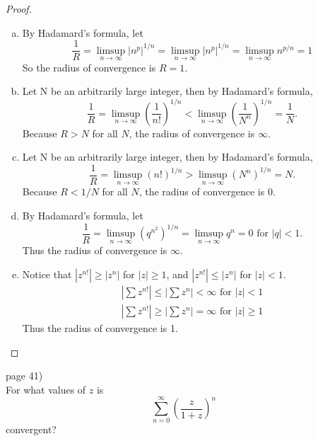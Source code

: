 \documentclass{article}
\newenvironment{problem}[2][Problem]{\begin{trivlist}
\item[\hskip \labelsep {\bfseries #1}\hskip \labelsep {\bfseries #2.}]}{\end{trivlist}}
\begin{document}
\begin{proof}
  \begin{enumerate}[(a)]
    \item By Hadamard's formula, let
      \[
        \frac{1}{R} = \limsup_{n \rightarrow \infty} |n^p|^{1/n}
        = \limsup_{n \rightarrow \infty} |n^p|^{1/n}
        = \limsup_{n \rightarrow \infty} n^{p/n}
        = 1
      \] So the radius of convergence is $R = 1$.

    \item Let N be an arbitrarily large integer, then by Hadamard's formula,\[
      \frac{1}{R} = \limsup_{n \rightarrow \infty} \left(\frac{1}{n!}\right)^{1/n}
      < \limsup_{n \rightarrow \infty} \left(\frac{1}{N^n}\right)^{1/n}
      = \frac{1}{N}.
    \] Because $R > N$ for all $N$, the radius of convergence is $\infty$.

    \item Let N be an arbitrarily large integer, then by Hadamard's formula,\[
      \frac{1}{R} = \limsup_{n \rightarrow \infty} (n!)^{1/n}
      > \limsup_{n \rightarrow \infty} (N^n)^{1/n}
      = N.
    \] Because $R < 1/N$ for all $N$, the radius of convergence is $0$.

    \item By Hadamard's formula, let \[
      \frac{1}{R} = \limsup_{n \rightarrow \infty} (q^{n^2})^{1/n}
      = \limsup_{n \rightarrow \infty} q^{n} = 0 \text { for } |q| < 1.
    \] Thus the radius of convergence is $\infty$.
    \item Notice that $|z^{n!}| \geq |z^n|$ for $|z| \geq 1$,
    and $|z^{n!}| \leq |z^n|$ for $|z| < 1$. \begin{align*}
      \left|\sum z^{n!}\right| \leq \left|\sum z^n\right| < \infty \text { for } |z| < 1 \\
      \left|\sum z^{n!}\right| \geq \left|\sum z^n\right| = \infty \text { for } |z| \geq 1
    \end{align*}
    Thus the radius of convergence is 1.
  \end{enumerate}
\end{proof}

\pagebreak

\begin{problem}{8} (page 41) \\
  For what values of $z$ is \[
    \sum_{n = 0}^\infty \left(
      \frac{z}{1 + z}
    \right)^n
  \] convergent?
\end{problem}
\end{document}
